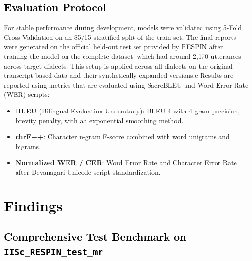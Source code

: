 \subsection{\textcolor{black}{Evaluation Protocol}}

For stable performance during development, models were validated using 5-Fold Cross-Validation on an 85/15 stratified split of the train set.
The final reports were generated on the official held-out test set provided by RESPIN after training the model on the complete dataset, which had around 2,170 utterances across target dialects.
This setup is applied across all dialects on the original transcript-based data and their synthetically expanded versions.e
Results are reported using metrics that are evaluated using SacreBLEU \cite{post2018sacrebleu} and Word Error Rate (WER) scripts:

\begin{itemize}
    \item \textbf{BLEU} (Bilingual Evaluation Understudy): BLEU-4 with 4-gram precision, brevity penalty, with an exponential smoothing method.
    \item \textbf{chrF++}: Character n-gram F-score combined with word unigrams and bigrams.
    \item \textbf{Normalized WER / CER}: Word Error Rate and Character Error Rate after Devanagari Unicode script standardization.
\end{itemize}



\section{\textcolor{black}{Findings}}
\label{sec:findings}

\subsection{\textcolor{black}{Comprehensive Test Benchmark on \texttt{IISc\_RESPIN\_test\_mr}}}

